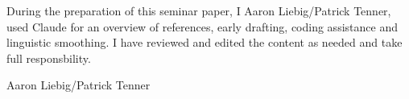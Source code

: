 \noindent
During the preparation of this seminar paper, I Aaron Liebig/Patrick Tenner, used Claude for an overview of references, 
early drafting, coding assistance and linguistic smoothing. I have reviewed and edited 
the content as needed and take full responsbility. 

\vspace{1.5em}
\noindent Aaron Liebig/Patrick Tenner

